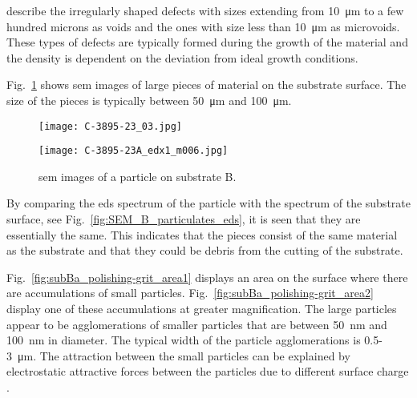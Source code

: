 \citet{reddy2014study} describe the irregularly shaped defects with sizes extending from \SI{10}{\micro\metre} to a few hundred microns as voids and the ones with size less than \SI{10}{\micro\metre} as microvoids. These types of defects are typically formed during the growth of the material and the density is dependent on the deviation from ideal growth conditions.

Fig.~\ref{fig:SEM_B_particulates} shows \ac{sem} images of large pieces of material on the substrate surface. The size of the pieces is typically between \SI{50}{\micro\metre} and \SI{100}{\micro\metre}.

\begin{figure}[htbp]
    \centering
          \begin{minipage}[t]{0.48\linewidth}
            \centering
            \texttt{[image: C-3895-23\_03.jpg]}
          \end{minipage}
          \hspace{0.02\linewidth}
          \begin{minipage}[t]{0.49\linewidth}
            \centering
            \texttt{[image: C-3895-23A\_edx1\_m006.jpg]}
          \end{minipage}
        \caption[\Ac{sem} images of a particle on substrate B.]{\Acf{sem} images of a particle on substrate B.}\label{fig:SEM_B_particulates}  
\end{figure}

By comparing the \ac{eds} spectrum of the particle with the spectrum of the substrate surface, see Fig.~\ref{fig:SEM_B_particulates_eds}, it is seen that they are essentially the same. This indicates that the pieces consist of the same material as the substrate and that they could be debris from the cutting of the substrate.

Fig.~\ref{fig:subBa_polishing-grit_area1} displays an area on the surface where there are accumulations of small particles. Fig.~\ref{fig:subBa_polishing-grit_area2} display one of these accumulations at greater magnification. The large particles appear to be agglomerations of smaller particles that are between \SI{50}{\nano\metre} and \SI{100}{\nano\metre} in diameter. The typical width of the particle agglomerations is \SI{0.5}{}-\SI{3}{\micro\metre}. The attraction between the small particles can be explained by electrostatic attractive forces between the particles due to different surface charge \citep{allen2001review}.

